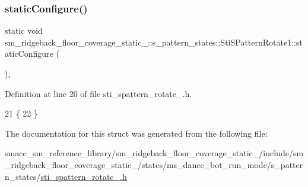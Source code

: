 \subsubsection{\texorpdfstring{static\+Configure()}{staticConfigure()}}
{\footnotesize\ttfamily static void sm\+\_\+ridgeback\+\_\+floor\+\_\+coverage\+\_\+static\+\_\+::s\+\_\+pattern\+\_\+states\+::\+Sti\+S\+Pattern\+Rotate1\+::static\+Configure (\begin{DoxyParamCaption}{ }\end{DoxyParamCaption})\hspace{0.3cm}{\ttfamily [inline]}, {\ttfamily [static]}}



Definition at line 20 of file sti\+\_\+spattern\+\_\+rotate\+\_.\+h.


\begin{DoxyCode}
21     \{
22     \}
\end{DoxyCode}


The documentation for this struct was generated from the following file\+:\begin{DoxyCompactItemize}
\item 
smacc\+\_\+sm\+\_\+reference\+\_\+library/sm\+\_\+ridgeback\+\_\+floor\+\_\+coverage\+\_\+static\+\_/include/sm\+\_\+ridgeback\+\_\+floor\+\_\+coverage\+\_\+static\+\_/states/ms\+\_\+dance\+\_\+bot\+\_\+run\+\_\+mode/s\+\_\+pattern\+\_\+states/\hyperlink{sm__ridgeback__floor__coverage__static__1_2include_2sm__ridgeback__floor__coverage__static__1_2sf8389b7a398a73cfe990e6974bdf3d74}{sti\+\_\+spattern\+\_\+rotate\+\_.\+h}\end{DoxyCompactItemize}
